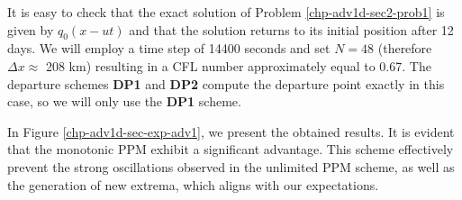 It is easy to check that the exact solution of Problem \ref{chp-adv1d-sec2-prob1} is given
by $q_0(x-ut)$ and that the solution returns to its initial position after 12 days.
We will employ a time step of 14400 seconds and set $N=48$ (therefore $\Delta x \approx$ 208 km) resulting in a CFL number approximately equal to 0.67.
The departure schemes \textbf{DP1} and \textbf{DP2} compute the departure point exactly in this case, so we will only use the \textbf{DP1} scheme.

In Figure \ref{chp-adv1d-sec-exp-adv1}, we present the obtained results.
It is evident that the monotonic PPM exhibit a significant advantage.
This scheme effectively prevent the strong oscillations observed in the unlimited PPM scheme,
as well as the generation of new extrema, which aligns with our expectations.

